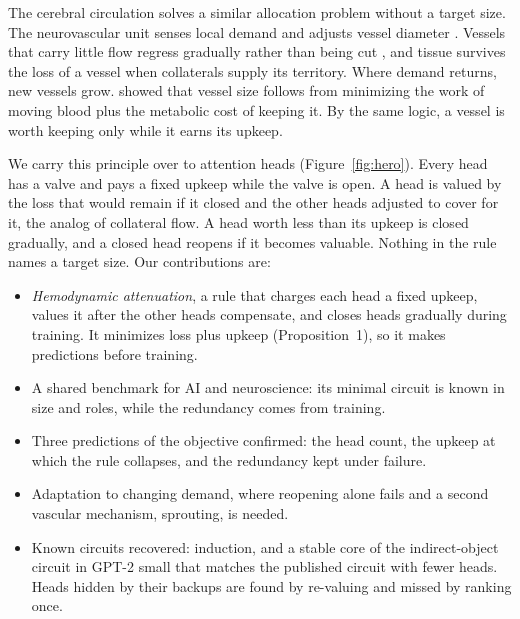 \documentclass[letterpaper]{article} %
\begin{document}
The cerebral circulation solves a similar allocation problem without a target size. The neurovascular unit senses local demand and adjusts vessel diameter \citep{iadecola2017nvu}. Vessels that carry little flow regress gradually rather than being cut \citep{korn2015pruning}, and tissue survives the loss of a vessel when collaterals supply its territory. Where demand returns, new vessels grow. \citet{murray1926} showed that vessel size follows from minimizing the work of moving blood plus the metabolic cost of keeping it. By the same logic, a vessel is worth keeping only while it earns its upkeep.

We carry this principle over to attention heads (Figure~\ref{fig:hero}). Every head has a valve and pays a fixed upkeep while the valve is open. A head is valued by the loss that would remain if it closed and the other heads adjusted to cover for it, the analog of collateral flow. A head worth less than its upkeep is closed gradually, and a closed head reopens if it becomes valuable. Nothing in the rule names a target size. Our contributions are:
\begin{itemize}
\item \emph{Hemodynamic attenuation}, a rule that charges each head a fixed upkeep, values it after the other heads compensate, and closes heads gradually during training. It minimizes loss plus upkeep (Proposition~1), so it makes predictions before training.
\item A shared benchmark for AI and neuroscience: its minimal circuit is known in size and roles, while the redundancy comes from training.
\item Three predictions of the objective confirmed: the head count, the upkeep at which the rule collapses, and the redundancy kept under failure.
\item Adaptation to changing demand, where reopening alone fails and a second vascular mechanism, sprouting, is needed.
\item Known circuits recovered: induction, and a stable core of the indirect-object circuit in GPT-2 small that matches the published circuit with fewer heads. Heads hidden by their backups are found by re-valuing and missed by ranking once.
\end{itemize}
\end{document}
